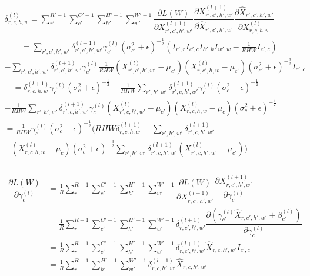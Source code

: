 \documentclass[a4paper,11pt,twoside]{article}
\newcommand*{\pd}[2]{\ensuremath{\dfrac{\partial #1}{\partial #2}}}
\begin{document}
\begin{multline}
	\delta^{(l)}_{r,c,h,w} = \sum^{R'-1}_{r'} \sum^{C'-1}_{c'} \sum^{H'-1}_{h'} \sum^{W'-1}_{w'} \pd{L(W)}{X^{(l+1)}_{r',c',h',w'}} \pd{X^{(l+1)}_{r',c',h',w'}}{\hat{X}_{r',c',h',w'}} \pd{\hat{X}_{r',c',h',w'}}{{X}^{(l)}_{r,c,h,w}}\\
		\qquad = \sum\limits_{r',c',h',w'}\delta^{(l+1)}_{r',c',h',w'} \gamma^{(l)}_{c'} {(\sigma^2_{c'} + \epsilon)}^{-\frac{1}{2}} (I_{r',r} I_{c',c} I_{h',h} I_{w',w} - \frac{1}{RHW} I_{c',c}) \\
	-\sum\limits_{r',c',h',w'}\delta^{(l+1)}_{r',c',h',w'} \gamma^{(l)}_{c'} \frac{1}{RHW} ({X^{(l)}_{r',c',h',w'} - \mu_{c'}})({X^{(l)}_{r,c',h,w} - \mu_{c'}}) {(\sigma^2_{c'} + \epsilon)}^{-\frac{3}{2}} I_{c',c} \\
	\quad = \delta^{(l+1)}_{r,c,h,w} \gamma^{(l)}_{c} {(\sigma^2_{c} + \epsilon)}^{-\frac{1}{2}} - \frac{1}{RHW} \sum\limits_{r',h',w'} \delta^{(l+1)}_{r',c,h',w'} \gamma^{(l)}_{c} {(\sigma^2_{c} + \epsilon)}^{-\frac{1}{2}}\\
	- \frac{1}{RHW} \sum\limits_{r',h',w'} \delta^{(l+1)}_{r',c,h',w'}\gamma^{(l)}_{c} ({X^{(l)}_{r',c,h',w'} - \mu_{c'}})({X^{(l)}_{r,c,h,w} - \mu_{c}}){(\sigma^2_{c} + \epsilon)}^{-\frac{3}{2}} \\
	= \frac{1}{RHW} \gamma^{(l)}_c {(\sigma^2_{c} + \epsilon)}^{-\frac{1}{2}} \biggl(    RHW \delta^{(l+1)}_{r,c,h,w} -  \sum\limits_{r',h',w'} \delta^{(l+1)}_{r',c,h',w'} \qquad \\
	-  ({X^{(l)}_{r,c,h,w} - \mu_{c}}) {(\sigma^2_{c} + \epsilon)}^{-\frac{3}{2}} \sum\limits_{r',h',w'} \delta^{(l+1)}_{r',c,h',w'} ({X^{(l)}_{r',c,h',w'} - \mu_{c'}}) \biggl) \\
\end{multline}

\begin{align}
\begin{split}
	\pd{L(W)}{\gamma^{(l)}_{c}}
		& = \frac{1}{R}\sum^{R-1}_{r} \sum^{C'-1}_{c'} \sum^{H'-1}_{h'} \sum^{W'-1}_{w'} \pd{L(W)}{X^{(l+1)}_{r,c',h',w'}} \pd{X^{(l+1)}_{r,c',h',w'}}{\gamma^{(l)}_{c}} \\
		& = \frac{1}{R}\sum^{R-1}_{r} \sum^{C'-1}_{c'} \sum^{H'-1}_{h'} \sum^{W'-1}_{w'} \delta^{(l+1)}_{r,c',h',w'}  \pd{({\gamma_{c'}^{(l)} \hat{X}_{r,c',h',w'} + \beta_{c'}^{(l)}})}{\gamma^{(l)}_{c}} \\
		& = \frac{1}{R}\sum^{R-1}_{r} \sum^{C'-1}_{c'} \sum^{H'-1}_{h'} \sum^{W'-1}_{w'} \delta^{(l+1)}_{r,c',h',w'} \hat{X}_{r,c,h',w'} I_{c',c}\\
		& = \frac{1}{R}\sum^{R-1}_{r} \sum^{H'-1}_{h'} \sum^{W'-1}_{w'} \delta^{(l+1)}_{r,c,h',w'} \hat{X}_{r,c,h',w'} \\
\end{split}
\end{align}
\end{document}
